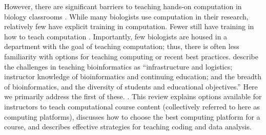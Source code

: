 However, there are significant barriers to teaching hands-on computation in biology classrooms \citep{Williams17}.
While many biologists use computation in their research, relatively few have explicit training in computation. 
Fewer still have training in how to teach computation \citep{Williams17}.
Importantly, few biologists are housed in a department with the goal of teaching computation;
thus, there is often less familiarity with options for teaching computing or recent best practices. 
\citet{Cummings10} describe the challenges in teaching bioinformatics as 
``infrastructure and logistics; instructor knowledge of bioinformatics and continuing education; and the breadth of bioinformatics, and the diversity of students and educational objectives.''
Here we primarily address the first of these. 
 \citep{Williams17}.
%
This review explains options available for instructors to teach computational course content
(collectively referred to here as computing platforms),
discusses how to choose the best computing platform for a course, 
and describes effective strategies for teaching coding and data analysis.


